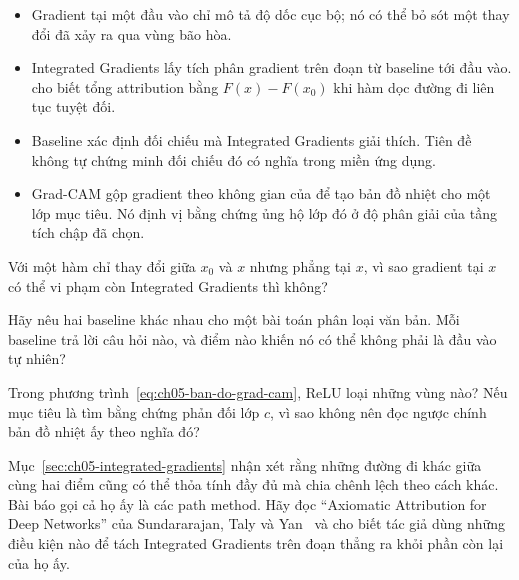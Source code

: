 \begin{tomtat}
\begin{itemize}
  \item Gradient tại một đầu vào chỉ mô tả độ dốc cục bộ; nó có thể bỏ sót một
  thay đổi đã xảy ra qua vùng bão hòa.
  \item Integrated Gradients lấy tích phân gradient trên đoạn từ baseline tới
  đầu vào.  cho biết tổng attribution bằng
  $F(x)-F(x_0)$ khi hàm dọc đường đi liên tục tuyệt đối.
  \item Baseline xác định đối chiếu mà Integrated Gradients giải thích. Tiên đề
  không tự chứng minh đối chiếu đó có nghĩa trong miền ứng dụng.
  \item Grad-CAM gộp gradient theo không gian của 
  để tạo bản đồ nhiệt cho một lớp mục tiêu. Nó định vị bằng chứng ủng hộ lớp
  đó ở độ phân giải của tầng tích chập đã chọn.
\end{itemize}
\end{tomtat}

\cauhoi
\begin{cauhoids}
  \item Với một hàm chỉ thay đổi giữa $x_0$ và $x$ nhưng phẳng tại $x$, vì sao
  gradient tại $x$ có thể vi phạm  còn Integrated Gradients thì không?
  \item Hãy nêu hai baseline khác nhau cho một bài toán phân loại văn bản. Mỗi
  baseline trả lời câu hỏi  nào, và điểm nào
  khiến nó có thể không
  phải là đầu vào tự nhiên?
  \item Trong phương trình~\ref{eq:ch05-ban-do-grad-cam}, ReLU loại những vùng
  nào? Nếu mục tiêu là tìm bằng chứng phản đối lớp $c$, vì sao không nên đọc
  ngược chính bản đồ nhiệt ấy theo nghĩa đó?
  \item Mục~\ref{sec:ch05-integrated-gradients} nhận xét rằng những đường đi
  khác giữa cùng hai điểm cũng có thể thỏa tính đầy đủ mà chia chênh lệch theo
  cách khác. Bài báo gọi cả họ ấy là các path method. Hãy đọc
  \enquote{Axiomatic Attribution for Deep Networks} của Sundararajan, Taly và
  Yan~\autocite{p11ig} và cho biết tác giả dùng những điều kiện nào để tách
  Integrated Gradients trên đoạn thẳng ra khỏi phần còn lại của họ ấy.
\end{cauhoids}
